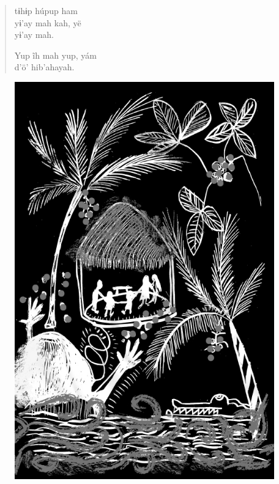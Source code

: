 \begin{verse}
tɨhɨp húpup ham\\
yɨ’ay mah kah, yë\\
yɨ’ay mah.

Yup ĩh mah yup, yám\\
d’ö’ hib’ahayah.
\end{verse}

\vspace*{\fill}

\begin{figure}
\vspace*{-1.5cm}
\hspace*{-2.4cm}\includegraphics[width=142mm]{./imgs/img8.jpg}
\end{figure}

